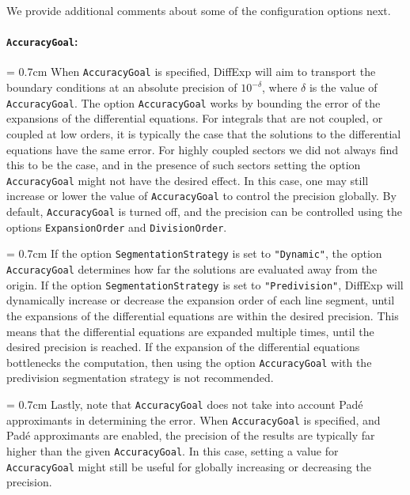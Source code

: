 \documentclass{article}
\begin{document}
We provide additional comments about some of the configuration options next.
{
\paragraph{\texttt{AccuracyGoal}:}
\parindent = 0.7cm \hangindent=0.7cm 
When \texttt{AccuracyGoal} is specified, DiffExp will aim to transport the boundary conditions at an absolute precision of $10^{-\delta}$, where $\delta$ is the value of \texttt{AccuracyGoal}. The option \texttt{AccuracyGoal} works by bounding the error of the expansions of the differential equations. For integrals that are not coupled, or coupled at low orders, it is typically the case that the solutions to the differential equations have the same error. For highly coupled sectors we did not always find this to be the case, and in the presence of such sectors setting the option \texttt{AccuracyGoal} might not have the desired effect. In this case, one may still increase or lower the value of \texttt{AccuracyGoal} to control the precision globally. By default, \texttt{AccuracyGoal} is turned off, and the precision can be controlled using the options \texttt{ExpansionOrder} and \texttt{DivisionOrder}. 

\parindent = 0.7cm \hangindent=0.7cm 
If the option \texttt{SegmentationStrategy} is set to \texttt{"Dynamic"}, the option \texttt{AccuracyGoal} determines how far the solutions are evaluated away from the origin. If the option \texttt{SegmentationStrategy} is set to \texttt{"Predivision"}, DiffExp will dynamically increase or decrease the expansion order of each line segment, until the expansions of the differential equations are within the desired precision. This means that the differential equations are expanded multiple times, until the desired precision is reached. If the expansion of the differential equations bottlenecks the computation, then using the option \texttt{AccuracyGoal} with the predivision segmentation strategy is not recommended.

\parindent = 0.7cm \hangindent=0.7cm Lastly, note that \texttt{AccuracyGoal} does not take into account Padé approximants in determining the error. When \texttt{AccuracyGoal} is specified, and Padé approximants are enabled, the precision of the results are typically far higher than the given \texttt{AccuracyGoal}. In this case, setting a value for \texttt{AccuracyGoal} might still be useful for globally increasing or decreasing the precision.

}
\end{document}
